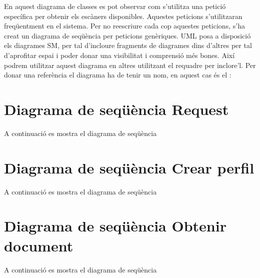 \documentclass[letterpaper,11pt,catalan]{sphinxmanual}
\begin{document}

En aquest diagrama de classes es pot observar com s'utilitza una petició específica
per obtenir els escàners disponibles. Aquestes peticions s'utilitzaran freqüentment
en el sistema. Per no reescriure cada cop aquestes peticions, s'ha creat un diagrama
de seqüència per peticions genèriques. UML posa a disposició els diagrames SM, per tal
d'incloure fragments de diagrames dins d'altres per tal d'aprofitar espai i poder donar
una visibilitat i comprensió més bones. Així podrem utilitzar aquest diagrama en altres
utilitzant el requadre  per inclore'l. Per donar una referència el diagrama ha de
tenir un nom, en aquest cas és el :


\section{Diagrama de seqüència Request}
\label{\detokenize{index:diagrama-de-sequencia-request}}
A continuació es mostra el diagrama de seqüència 



\section{Diagrama de seqüència Crear perfil}
\label{\detokenize{index:diagrama-de-sequencia-crear-perfil}}
A continuació es mostra el diagrama de seqüència 



\section{Diagrama de seqüència Obtenir document}
\label{\detokenize{index:diagrama-de-sequencia-obtenir-document}}
A continuació es mostra el diagrama de seqüència 
\end{document}
